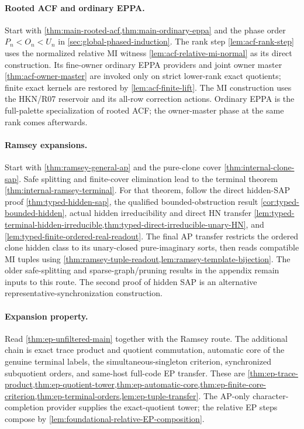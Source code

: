 \documentclass[11pt,a4paper]{article}
\theoremstyle{remark}\newtheorem{remark}[theorem]{Remark}
\theoremstyle{definition}
\theoremstyle{remark}
\begin{document}
\paragraph{Rooted ACF and ordinary EPPA.}
Start with \cref{thm:main-rooted-acf,thm:main-ordinary-eppa} and the
phase order $P_n<O_n<U_n$ in \cref{sec:global-phased-induction}.
The rank step \cref{lem:acf-rank-step} uses the normalized relative MI
witness \cref{lem:acf-relative-mi-normal} as its direct construction.
Its fine-owner ordinary EPPA providers and joint owner master
\cref{thm:acf-owner-master} are invoked only on strict lower-rank exact
quotients; finite exact kernels are restored by \cref{lem:acf-finite-lift}.
The MI construction uses the HKN/R07 reservoir and its
all-row correction actions. Ordinary EPPA is the full-palette
specialization of rooted ACF; the owner-master phase at the same rank
comes afterwards.

\paragraph{Ramsey expansions.}
Start with \cref{thm:ramsey-general-ap} and the pure-clone cover
\cref{thm:internal-clone-sap}. Safe splitting and finite-cover elimination
lead to the terminal theorem \cref{thm:internal-ramsey-terminal}.
For that theorem, follow the direct hidden-SAP proof
\cref{thm:typed-hidden-sap}, the qualified bounded-obstruction result
\cref{cor:typed-bounded-hidden}, actual hidden irreducibility and direct HN
transfer \cref{lem:typed-terminal-hidden-irreducible,thm:typed-direct-irreducible-unary-HN}, and
\cref{lem:typed-finite-ordered-real-readout}.
The final AP transfer restricts the ordered clone hidden class to its
unary-closed pure-imaginary sorts, then reads compatible MI tuples using
\cref{thm:ramsey-tuple-readout,lem:ramsey-template-bijection}.
The older safe-splitting and sparse-graph/pruning results in the appendix
remain inputs to this route. The second proof of hidden SAP is an
alternative representative-synchronization construction.

\paragraph{Expansion property.}
Read \cref{thm:ep-unfiltered-main} together with the Ramsey route.
The additional chain is exact trace product and quotient commutation,
automatic core of the genuine terminal labels, the simultaneous-singleton
criterion, synchronized subquotient orders, and same-host full-code EP
transfer. These are
\cref{thm:ep-trace-product,thm:ep-quotient-tower,thm:ep-automatic-core,thm:ep-finite-core-criterion,thm:ep-terminal-orders,lem:ep-tuple-transfer}.
The AP-only character-completion provider supplies the exact-quotient
tower; the relative EP steps compose by
\cref{lem:foundational-relative-EP-composition}.
\end{document}
